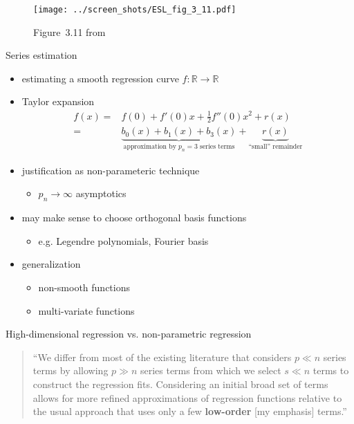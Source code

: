 \documentclass[xcolor=dvipsnames, handout]{beamer}
\begin{document}
\begin{frame}
\begin{figure}
  \texttt{[image: ../screen\_shots/ESL\_fig\_3\_11.pdf]}
   \caption{Figure~3.11 from \textcite{hastie2009elements}}
\end{figure}
\end{frame}


\begin{frame}{Series estimation \parencite{newey1997convergence}}
\begin{itemize}
  \item estimating a smooth regression curve $f: \mathbb{R} \to \mathbb{R}$
  \item Taylor expansion 
  \begin{align*}
    f(x) =& f(0) + f'(0)x + \frac{1}{2} f''(0) x^2 + r(x)
  \\
    =& \underbrace{b_0(x) + b_1(x) + b_{3}(x)}_{\text{approximation by $p_n = 3$ series terms}} + \underbrace{r(x)}_{\text{``small'' remainder}}
  \end{align*}
  \item justification as non-parameteric technique
  \begin{itemize}
    \item 
    $p_n \to \infty$ asymptotics
  \end{itemize}
  \item may make sense to choose orthogonal basis functions
  \begin{itemize}
    \item e.g. Legendre polynomials, Fourier basis
  \end{itemize}
  \item generalization
  \begin{itemize}
    \item non-smooth functions 
    \item multi-variate functions
  \end{itemize}
\end{itemize}
\end{frame}

\begin{frame}{High-dimensional regression vs. non-parametric regression}
\begin{quote}
  ``We differ from most of the existing literature that considers $p \ll n$ series terms by allowing $p \gg n$ series terms from which we select $s \ll n$ terms to construct the regression fits. Considering an initial broad set of terms allows for more refined approximations of regression functions relative to the usual approach that uses only a few \textbf{low-order} [my emphasis] terms.''\parencite{belloni2014inference}
\end{quote}
\end{frame}
\end{document}
